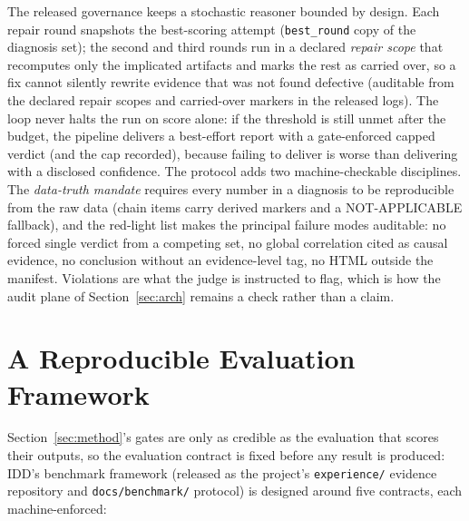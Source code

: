 \documentclass[preprint,12pt]{elsarticle}
\begin{document}
The released governance keeps a stochastic reasoner bounded by design. Each repair round snapshots the best-scoring attempt (\texttt{best\_round} copy of the diagnosis set); the second and third rounds run in a declared \emph{repair scope} that recomputes only the implicated artifacts and marks the rest as carried over, so a fix cannot silently rewrite evidence that was not found defective (auditable from the declared repair scopes and carried-over markers in the released logs). The loop never halts the run on score alone: if the threshold is still unmet after the budget, the pipeline delivers a best-effort report with a gate-enforced capped verdict (and the cap recorded), because failing to deliver is worse than delivering with a disclosed confidence. The protocol adds two machine-checkable disciplines. The \emph{data-truth mandate} requires every number in a diagnosis to be reproducible from the raw data (chain items carry derived markers and a NOT-APPLICABLE fallback), and the red-light list makes the principal failure modes auditable: no forced single verdict from a competing set, no global correlation cited as causal evidence, no conclusion without an evidence-level tag, no HTML outside the manifest. Violations are what the judge is instructed to flag, which is how the audit plane of Section~\ref{sec:arch} remains a check rather than a claim.

\section{A Reproducible Evaluation Framework}
\label{sec:framework}

Section~\ref{sec:method}'s gates are only as credible as the evaluation that scores their outputs, so the evaluation contract is fixed before any result is produced: IDD's benchmark framework (released as the project's \texttt{experience/} evidence repository and \texttt{docs/benchmark/} protocol) is designed around five contracts, each machine-enforced:
\end{document}
